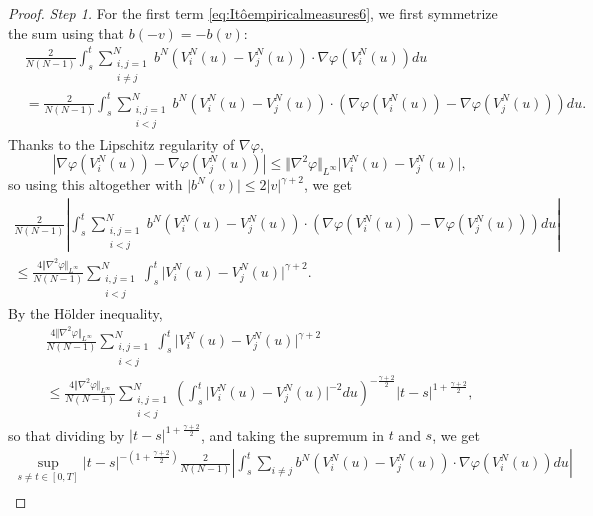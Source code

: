 \documentclass[11pt,a4paper]{article}
\theoremstyle{definition}
\theoremstyle{plain}
\begin{document}
\begin{proof}
\textit{Step 1.} For the first term \eqref{eq:Itôempiricalmeasures6}, we first symmetrize the sum using that $b(-v)=-b(v)$:
\begin{align*}
    &\frac{2}{N(N-1)}\int_s^t \sum_{\substack{i,j=1\\ i\neq j}}^N  b^N\left(V^N_i(u) -V^N_j(u)\right) \cdot \nabla\varphi\left(V^N_i(u)\right) du\\
    &=\frac{2}{N(N-1)}\int_s^t \sum_{\substack{i,j=1\\ i<j}}^N  b^N\left(V^N_i(u) -V^N_j(u)\right) \cdot \left(\nabla\varphi\left(V^N_i(u)\right)-\nabla\varphi\left(V^N_j(u)\right)\right) du.
\end{align*}
Thanks to the Lipschitz regularity of $\nabla \varphi$,
$$\left\vert\nabla\varphi\left(V^N_i(u)\right)-\nabla\varphi\left(V^N_j(u)\right)\right\vert \leq \Vert \nabla^2 \varphi\Vert_{L^\infty}  \vert V^N_i(u)-V^N_j(u) \vert,$$ so using this altogether with $\vert b^N(v)\vert \leq 2 \vert v \vert^{\gamma+2}$, we get
\begin{multline*}
\frac{2}{N(N-1)}\left\vert \int_s^t \sum_{\substack{i,j=1\\ i<j}}^N  b^N\left(V^N_i(u) -V^N_j(u)\right) \cdot \left(\nabla\varphi\left(V^N_i(u)\right)-\nabla\varphi\left(V^N_j(u)\right)\right) du\right\vert\\
\leq \frac{4\Vert \nabla^2 \varphi\Vert_{L^\infty}}{N(N-1)}\sum_{\substack{i,j=1\\ i<j}}^N \int_s^t   \vert V^N_i(u)-V^N_j(u) \vert^{\gamma+2}.
\end{multline*}
By the Hölder inequality,
\begin{multline*}
\frac{4\Vert \nabla^2 \varphi\Vert_{L^\infty}}{N(N-1)}\sum_{\substack{i,j=1\\ i<j}}^N \int_s^t   \vert V^N_i(u)-V^N_j(u) \vert^{\gamma+2}\\
\leq \frac{4\Vert \nabla^2 \varphi\Vert_{L^\infty}}{N(N-1)}\sum_{\substack{i,j=1\\ i<j}}^N \left(\int_s^t   \vert V^N_i(u)-V^N_j(u) \vert^{-2}du\right)^{-\frac{\gamma+2}{2}}\vert t-s\vert^{1+\frac{\gamma+2}{2}},
\end{multline*}
so that dividing by $\vert t-s\vert^{1+\frac{\gamma+2}{2}}$, and taking the supremum in $t$ and $s$, we get
\begin{multline*}
    \sup_{s\neq t\in[0,T]} \vert t-s\vert^{-(1+\frac{\gamma+2}{2})}\frac{2}{N(N-1)}\left\vert \int_s^t \sum_{i \neq j}  b^N\left(V^N_i(u) -V^N_j(u)\right) \cdot \nabla\varphi\left(V^N_i(u)\right) du \right\vert\\

\end{multline*}
\end{proof}
\end{document}
